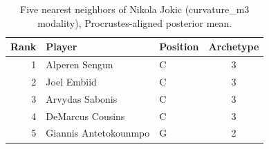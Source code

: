 \begin{table}[htbp]
  \centering\small
  \begin{tabular}{rllc}
    \toprule
    Rank & Player & Position & Archetype \\
    \midrule
    1 & Alperen Sengun & C & 3 \\
    2 & Joel Embiid & C & 3 \\
    3 & Arvydas Sabonis & C & 3 \\
    4 & DeMarcus Cousins & C & 3 \\
    5 & Giannis Antetokounmpo & G & 2 \\
    \bottomrule
  \end{tabular}
  \caption{Five nearest neighbors of Nikola Jokic (curvature_m3 modality), Procrustes-aligned posterior mean.}
  \label{tab:Nikola_Jokic_neighbors_curvature_m3}
\end{table}

